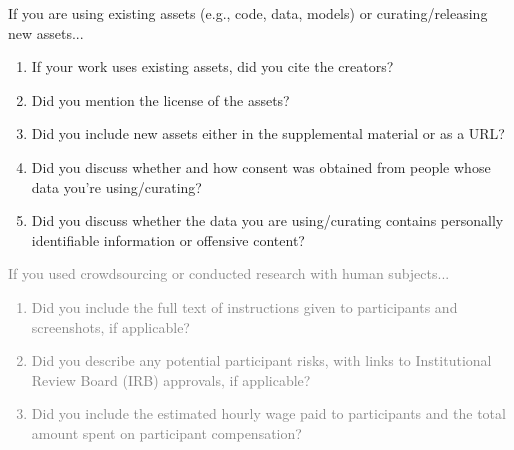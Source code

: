 \documentclass{article}
\begin{document}
\begin{enumerate}
\item If you are using existing assets (e.g., code, data, models) or
curating/releasing new assets...
\begin{enumerate}
  \item If your work uses existing assets, did you cite the creators?
    \answerYes{}
  \item Did you mention the license of the assets?
    \answerYes{}
  \item Did you include new assets either in the supplemental material or as a URL?
    \answerNo{}
  \item Did you discuss whether and how consent was obtained from people whose data you're using/curating?
    \answerNA{}
  \item Did you discuss whether the data you are using/curating
    contains personally identifiable information or offensive content?
    \answerNA{}
\end{enumerate}

\textcolor{gray}{
\item If you used crowdsourcing or conducted research with human subjects...
\begin{enumerate}
  \item Did you include the full text of instructions given to
    participants and screenshots, if applicable?
    \answerNA{}
  \item Did you describe any potential participant risks, with links
    to Institutional Review Board (IRB) approvals, if applicable?
    \answerNA{}
  \item Did you include the estimated hourly wage paid to participants
    and the total amount spent on participant compensation?
    \answerNA{}
\end{enumerate}
}

\end{enumerate}
\fi

\newpage
\appendix
\end{document}
